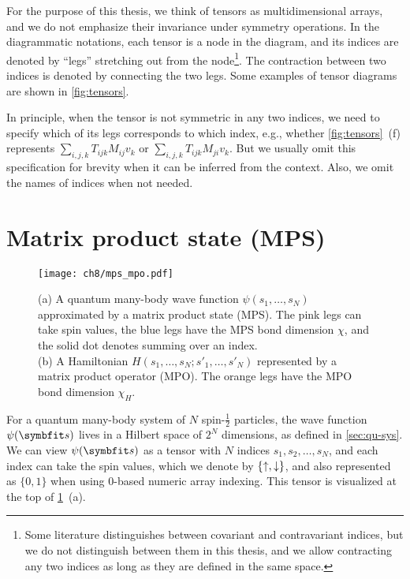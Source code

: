 For the purpose of this thesis, we think of tensors as multidimensional arrays, and we do not emphasize their invariance under symmetry operations. In the diagrammatic notations, each tensor is a node in the diagram, and its indices are denoted by ``legs'' stretching out from the node\footnote{Some literature distinguishes between covariant and contravariant indices, but we do not distinguish between them in this thesis, and we allow contracting any two indices as long as they are defined in the same space.}. The contraction between two indices is denoted by connecting the two legs. Some examples of tensor diagrams are shown in \cref{fig:tensors}.

In principle, when the tensor is not symmetric in any two indices, we need to specify which of its legs corresponds to which index, e.g., whether \cref{fig:tensors}~(f) represents $\sum_{i, j, k} T_{i j k} M_{i j} v_k$ or $\sum_{i, j, k} T_{i j k} M_{j i} v_k$. But we usually omit this specification for brevity when it can be inferred from the context. Also, we omit the names of indices when not needed.

\section{Matrix product state (MPS)}

\begin{figure}[htb]
\centering
\texttt{[image: ch8/mps\_mpo.pdf]}
\caption[Matrix product state (MPS) and matrix product operator (MPO)]{
(a) A quantum many-body wave function $\psi(s_1, \ldots, s_N)$ approximated by a matrix product state (MPS).
The {\color[HTML]{e377c2} pink} legs can take spin values, the {\color[HTML]{1f77b4} blue} legs have the MPS bond dimension $\chi$, and the solid dot denotes summing over an index. \\
(b) A Hamiltonian $H(s_1, \ldots, s_N; s'_1, \ldots, s'_N)$ represented by a matrix product operator (MPO).
The {\color[HTML]{ff7f0e} orange} legs have the MPO bond dimension $\chi_H$.
}
\label{fig:mps-mpo}
\end{figure}

For a quantum many-body system of $N$ spin-$\frac{1}{2}$ particles, the wave function $\psi(\vs)$ lives in a Hilbert space of $2^N$ dimensions, as defined in \cref{sec:qu-sys}. We can view $\psi(\vs)$ as a tensor with $N$ indices $s_1, s_2, \ldots, s_N$, and each index can take the spin values, which we denote by $\{{\uparrow}, {\downarrow}\}$, and also represented as $\{0, 1\}$ when using $0$-based numeric array indexing. This tensor is visualized at the top of \cref{fig:mps-mpo}~(a).

